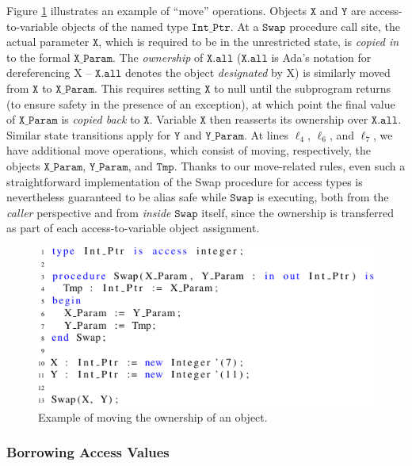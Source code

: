 \documentclass[runningheads]{llncs}
\newcommand\var[1]{\ensuremath{\mathtt{#1}}}
\begin{document}
Figure \ref{fig:move_ex1} illustrates an example of ``move'' operations. Objects \var{X} and \var{Y} are access-to-variable objects of the named type \var{Int\_Ptr}. At a \var{Swap} procedure call site,
the actual parameter \var{X}, which is required to be in the unrestricted state, is \textit{copied in} to the formal \var{X\_Param}. The \textit{ownership} of \var{X.all} (\var{X.all} is Ada's notation for dereferencing X -- \var{X.all} denotes the object \textit{designated} by X) is similarly moved from \var{X} to \var{X\_Param}.
This requires setting \var{X} to null until the subprogram returns (to ensure safety in the presence of an exception), at which point the final value of \var{X\_Param} is \textit{copied back} to \var{X}.
Variable \var{X} then reasserts its ownership over \var{X.all}. Similar state transitions apply for \var{Y} and \var{Y\_Param}.  At lines $\ell_4$, $\ell_6$, and $\ell_7$,
we have additional move operations, which consist of moving, respectively, the objects \var{X\_Param}, \var{Y\_Param}, and \var{Tmp}. Thanks to our move-related rules, even such a straightforward
implementation of the Swap procedure for access types is nevertheless guaranteed to be alias safe while \var{Swap} is executing, both from the \textit{caller} perspective and from \textit{inside} \var{Swap} itself, since the ownership is transferred
as part of each access-to-variable object assignment.

\begin{figure}[htb!]
\centering
   \includegraphics[]{move_ex1}
   \caption{Example of moving the ownership of an object.}
   \label{fig:move_ex1}
\end{figure}

\subsubsection{Borrowing Access Values}
\label{sec:borrowing}
\end{document}
